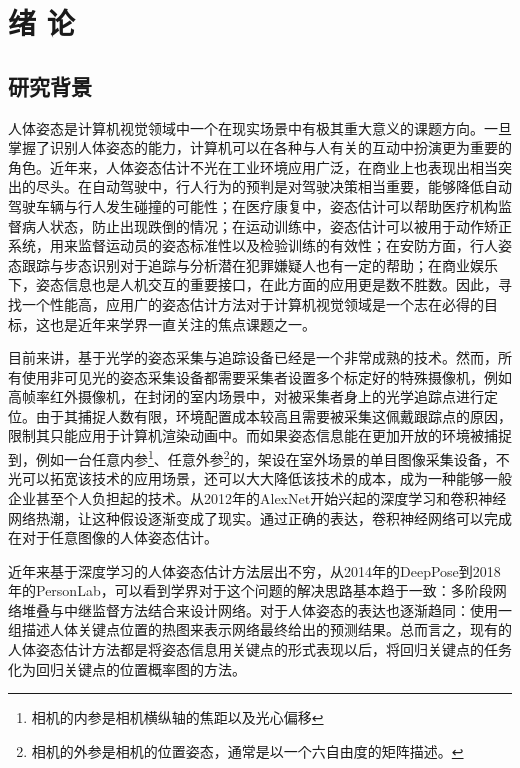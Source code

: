 \chapter{绪 论}
\label{cha:intro}


\section{研究背景}
\label{sec:generalbackground}
人体姿态是计算机视觉领域中一个在现实场景中有极其重大意义的课题方向。一旦掌握了识别人体姿态的能力，计算机可以在各种与人有关的互动中扮演更为重要的角色。近年来，人体姿态估计不光在工业环境应用广泛，在商业上也表现出相当突出的尽头。在自动驾驶中，行人行为的预判是对驾驶决策相当重要，能够降低自动驾驶车辆与行人发生碰撞的可能性；在医疗康复中，姿态估计可以帮助医疗机构监督病人状态，防止出现跌倒的情况；在运动训练中，姿态估计可以被用于动作矫正系统，用来监督运动员的姿态标准性以及检验训练的有效性；在安防方面，行人姿态跟踪与步态识别对于追踪与分析潜在犯罪嫌疑人也有一定的帮助；在商业娱乐下，姿态信息也是人机交互的重要接口，在此方面的应用更是数不胜数。因此，寻找一个性能高，应用广的姿态估计方法对于计算机视觉领域是一个志在必得的目标，这也是近年来学界一直关注的焦点课题之一。

目前来讲，基于光学的姿态采集与追踪设备已经是一个非常成熟的技术。然而，所有使用非可见光的姿态采集设备都需要采集者设置多个标定好的特殊摄像机，例如高帧率红外摄像机，在封闭的室内场景中，对被采集者身上的光学追踪点进行定位。由于其捕捉人数有限，环境配置成本较高且需要被采集这佩戴跟踪点的原因，限制其只能应用于计算机渲染动画中。而如果姿态信息能在更加开放的环境被捕捉到，例如一台任意内参\footnote{相机的内参是相机横纵轴的焦距以及光心偏移}、任意外参\footnote{相机的外参是相机的位置姿态，通常是以一个六自由度的矩阵描述。}的，架设在室外场景的单目图像采集设备，不光可以拓宽该技术的应用场景，还可以大大降低该技术的成本，成为一种能够一般企业甚至个人负担起的技术。从2012年的AlexNet\cite{alex2012alexnet}开始兴起的深度学习和卷积神经网络热潮，让这种假设逐渐变成了现实。通过正确的表达，卷积神经网络可以完成在对于任意图像的人体姿态估计。

近年来基于深度学习的人体姿态估计方法层出不穷，从2014年的DeepPose\cite{toshev2014deeppose}到2018年的PersonLab\cite{Papandreou2018PersonLab}，可以看到学界对于这个问题的解决思路基本趋于一致：多阶段网络堆叠与中继监督方法结合来设计网络。对于人体姿态的表达也逐渐趋同：使用一组描述人体关键点位置的热图来表示网络最终给出的预测结果。总而言之，现有的人体姿态估计方法都是将姿态信息用关键点的形式表现以后，将回归关键点的任务化为回归关键点的位置概率图的方法。

